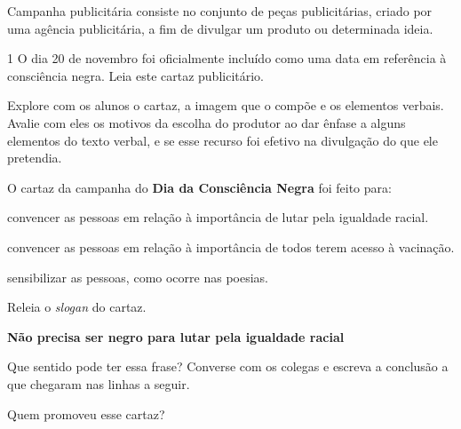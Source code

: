 \begin{escolha}
\begin{escolha}
{Campanha publicitária consiste no conjunto de peças publicitárias,
criado por uma agência publicitária, a fim de divulgar um produto ou
determinada ideia.
}


\num{1} O dia 20 de novembro foi oficialmente incluído como uma data em
referência à consciência negra. Leia este cartaz publicitário.

Explore com os alunos o cartaz, a imagem que o compõe e os elementos
verbais. Avalie com eles os motivos da escolha do produtor ao dar ênfase
a alguns elementos do texto verbal, e se esse recurso foi efetivo na
divulgação do que ele pretendia.


\begin{escolha}
\item O cartaz da campanha do \textbf{Dia da Consciência Negra} foi feito para:

\begin{boxlist}
\boxitem[\rosa{X}] convencer as pessoas em relação à importância de lutar pela igualdade racial.

\boxitem[] convencer as pessoas em relação à importância de todos terem acesso à vacinação.

\boxitem[] sensibilizar as pessoas, como ocorre nas poesias.
\end{boxlist}

\item Releia o \emph{slogan} do cartaz.

\begin{mdframed}[linewidth=10pt,linecolor=salmao!20,backgroundcolor=salmao!20,roundcorner=20pt]
\textbf{Não precisa ser negro para lutar pela igualdade racial}
\end{mdframed}

Que sentido pode ter essa frase? Converse com os colegas e escreva a
conclusão a que chegaram nas linhas a seguir.


\item Quem promoveu esse cartaz?


\end{escolha}
\end{escolha}
\end{escolha}
